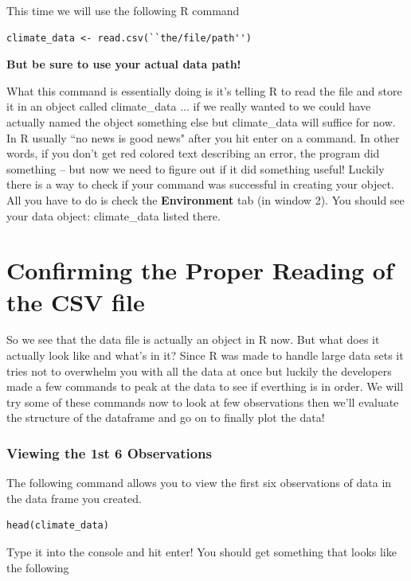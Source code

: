 \documentclass{article}\usepackage[]{graphicx}\usepackage[]{color}
\begin{document}
This time we will use the following R command\\
\begin{verbatim}
climate_data <- read.csv(``the/file/path'')
\end{verbatim}

\textbf{But be sure to use your actual data path!}

What this command is essentially doing is it's telling R to read the file and store it in an object called climate\_data ... if we really wanted to we could have actually named the object something else but climate\_data will suffice for now. \\ 

In R usually ``no news is good news" after you hit enter on a command. In other words, if you don't get red colored text describing an error, the program did something -- but now we need to figure out if it did something useful! Luckily there is a way to check if your command was successful in creating your object. All you have to do is check the \textbf{Environment} tab (in window 2). You should see your data object: climate\_data listed there. 


\section{Confirming the Proper Reading of the CSV file}


So we see that the data file is actually an object in R now. But what does it actually look like and what's in it? 
Since R was made to handle large data sets it tries not to overwhelm you with all the data at once but luckily the developers made a few commands to peak at the data to see if everthing is in order. We will try some of these commands now to look at few observations then we'll evaluate the structure of the dataframe and go on to finally plot the data!

\subsubsection{Viewing the 1st 6 Observations}
The following command allows you to view the first six observations of data in the data frame you created.
\begin{verbatim}
head(climate_data)
\end{verbatim}
Type it into the console and hit enter! You should get something that looks like the following
\end{document}
